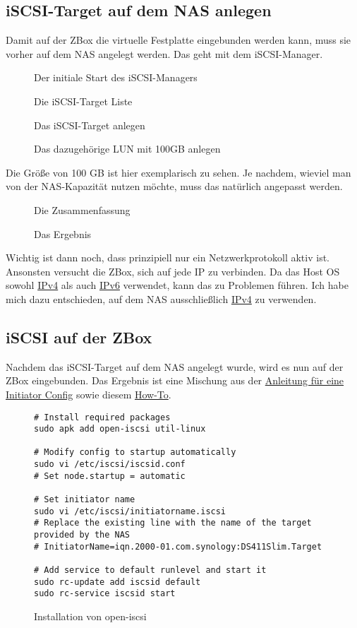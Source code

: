 \documentclass[12pt,a4paper]{article}
\newcommand{\jpaimg}[2]{\begin{figure}[H]\centering\fbox{\texttt{[image: \#1]}}\caption{#2}\label{fig:#2}\end{figure}}
\begin{document}
\subsection{iSCSI-Target auf dem NAS anlegen}
Damit auf der ZBox die virtuelle Festplatte eingebunden werden kann, muss sie vorher auf dem NAS angelegt werden. Das
geht mit dem iSCSI-Manager.

\jpaimg{./images/DSM-ISCSI-01.png}{Der initiale Start des iSCSI-Managers}

\jpaimg{./images/DSM-ISCSI-02.png}{Die iSCSI-Target Liste}

\jpaimg{./images/DSM-ISCSI-03.png}{Das iSCSI-Target anlegen}

\jpaimg{./images/DSM-ISCSI-04.png}{Das dazugehörige LUN mit 100GB anlegen}

Die Größe von 100 GB ist hier exemplarisch zu sehen. Je nachdem, wieviel man von der NAS-Kapazität nutzen möchte, muss
das natürlich angepasst werden.

\jpaimg{./images/DSM-ISCSI-05.png}{Die Zusammenfassung}

\jpaimg{./images/DSM-ISCSI-06.png}{Das Ergebnis}

Wichtig ist dann noch, dass prinzipiell nur ein Netzwerkprotokoll aktiv ist. Ansonsten versucht die ZBox, sich auf jede
IP zu verbinden. Da das Host OS sowohl \href{https://de.wikipedia.org/wiki/IPv4}{IPv4} als auch \href{https://de.wikipedia.org/wiki/IPv6}{IPv6}
verwendet, kann das zu Problemen führen. Ich habe mich dazu entschieden, auf dem NAS ausschließlich \href{https://de.wikipedia.org/wiki/IPv4}{IPv4}
zu verwenden.

\subsection{iSCSI auf der ZBox}
Nachdem das iSCSI-Target auf dem NAS angelegt wurde, wird es nun auf der ZBox eingebunden. Das Ergebnis ist eine Mischung
aus der \href{https://wiki.alpinelinux.org/wiki/ISCSI_Raid_and_Clustered_File_Systems}{Anleitung für eine Initiator Config}
sowie diesem \href{https://kifarunix.com/how-to-install-and-configure-iscsi-storage-server-on-ubuntu-18-04/}{How-To}.

\begin{figure}[H]
\begin{lstlisting}
# Install required packages
sudo apk add open-iscsi util-linux

# Modify config to startup automatically
sudo vi /etc/iscsi/iscsid.conf
# Set node.startup = automatic

# Set initiator name
sudo vi /etc/iscsi/initiatorname.iscsi
# Replace the existing line with the name of the target provided by the NAS
# InitiatorName=iqn.2000-01.com.synology:DS411Slim.Target

# Add service to default runlevel and start it
sudo rc-update add iscsid default
sudo rc-service iscsid start
\end{lstlisting}
\caption{Installation von open-iscsi}\label{fig:Installation von open-iscsi}
\end{figure}
\end{document}
